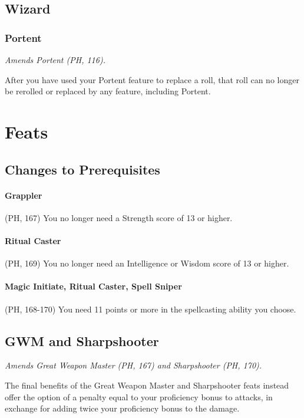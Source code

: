 \documentclass[House_Rules.tex]{subfiles}
\begin{document}
\subsection{Wizard}

\subsubsection{Portent}
\textit{Amends Portent (PH, 116).}

After you have used your Portent feature to replace a roll, that roll can no longer be rerolled or replaced by any feature, including Portent.




\section{Feats}

\subsection{Changes to Prerequisites}

\paragraph{Grappler} (PH, 167) You no longer need a Strength score of 13 or higher.

\paragraph{Ritual Caster} (PH, 169) You no longer need an Intelligence or Wisdom score of 13 or higher.

\paragraph{Magic Initiate, Ritual Caster, Spell Sniper} (PH, 168-170) You need 11 points or more in the spellcasting ability you choose.

\subsection{GWM and Sharpshooter}
\textit{Amends Great Weapon Master (PH, 167) and Sharpshooter (PH, 170).}

The final benefits of the Great Weapon Master and Sharpshooter feats instead offer the option of a penalty equal to your proficiency bonus to attacks, in exchange for adding twice your proficiency bonus to the damage.
\end{document}
